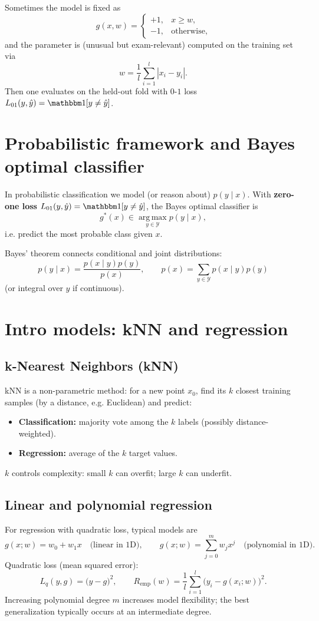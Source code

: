 \documentclass[11pt, oneside]{book}
\newcommand{\argmax}{\operatorname*{arg\,max}}
\newcommand{\1}{\ind}                       %
\begin{document}
\begin{notebox}[title={Exam: Threshold Model}]
Sometimes the model is fixed as
\[
g(x,w)=
\begin{cases}
+1,& x\ge w,\\
-1,& \text{otherwise},
\end{cases}
\]
and the parameter is (unusual but exam-relevant) computed on the training set via
\[
w=\frac{1}{l}\sum_{i=1}^l |x_i-y_i|.
\]
Then one evaluates on the held-out fold with $0$-$1$ loss $L_{01}(y,\hat y)=\1[y\neq \hat y]$.
\end{notebox}

\section{Probabilistic framework and Bayes optimal classifier}
In probabilistic classification we model (or reason about) $p(y\mid x)$.
With \textbf{zero-one loss} $L_{01}(y,\hat y)=\1[y\neq \hat y]$, the Bayes optimal classifier is
\[
  g^*(x)\in \argmax_{y\in\mathcal{Y}} p(y\mid x),
\]
i.e. predict the most probable class given $x$.

Bayes' theorem connects conditional and joint distributions:
\[
  p(y\mid x)=\frac{p(x\mid y)p(y)}{p(x)},\qquad
  p(x)=\sum_{y\in\mathcal{Y}} p(x\mid y)p(y)
\]
(or integral over $y$ if continuous).

\section{Intro models: kNN and regression}
\subsection{k-Nearest Neighbors (kNN)}
kNN is a non-parametric method: for a new point $x_0$, find its $k$ closest training samples (by a distance, e.g. Euclidean) and predict:
\begin{itemize}
  \item \textbf{Classification:} majority vote among the $k$ labels (possibly distance-weighted).
  \item \textbf{Regression:} average of the $k$ target values.
\end{itemize}
$k$ controls complexity: small $k$ can overfit; large $k$ can underfit.

\subsection{Linear and polynomial regression}
For regression with quadratic loss, typical models are
\[
  g(x;w)=w_0+w_1x \quad \text{(linear in 1D)},
\qquad
  g(x;w)=\sum_{j=0}^{m} w_j x^j \quad \text{(polynomial in 1D)}.
\]
Quadratic loss (mean squared error):
\[
  L_q(y,g)=\big(y-g\big)^2,\qquad
  R_{\mathrm{emp}}(w)=\frac{1}{l}\sum_{i=1}^l \big(y_i-g(x_i;w)\big)^2.
\]
Increasing polynomial degree $m$ increases model flexibility; the best generalization typically occurs at an intermediate degree.
\end{document}
